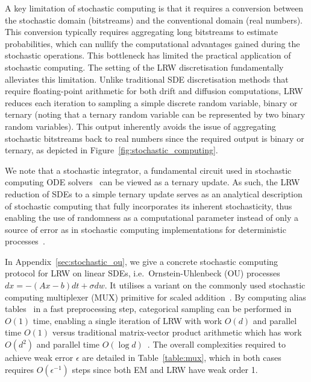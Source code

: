 \documentclass[pra,showpacs,amsmath,amssymb,amsfonts,lengthcheck,longbibliography,onecolumn]{revtex4-2}
\begin{document}
A key limitation of stochastic computing is that it requires a conversion between the stochastic
domain (bitstreams) and the conventional domain (real numbers). This conversion typically requires
aggregating long bitstreams to estimate probabilities, which can nullify the computational
advantages gained during the stochastic operations. This bottleneck has limited the practical
application of stochastic computing. The setting of the LRW discretisation
fundamentally alleviates this limitation. Unlike traditional SDE
discretisation methods that require floating-point arithmetic for both drift and diffusion
computations, LRW reduces each iteration to sampling a simple discrete random variable, binary
or ternary (noting that a ternary random variable can be represented by two binary random
variables).  This output inherently avoids the issue of aggregating stochastic bitstreams
back to real numbers since the required output is binary or ternary, as depicted in Figure~\ref{fig:stochastic_computing}.

We note that a stochastic integrator, a fundamental circuit used in stochastic computing ODE solvers~\cite{gaines1967stochastic, liu2017hardware, liu2020dynamic} can be viewed as a ternary update. As such, the LRW reduction of SDEs to a simple ternary update serves as an analytical description of stochastic computing that fully incorporates its inherent stochasticity, thus enabling the use of randomness as a computational parameter instead of only a source of error as in stochastic computing implementations for deterministic processes~\cite{liu2017hardware, camps2021stochastic}.


In Appendix~\ref{sec:stochastic_ou}, we give a concrete stochastic computing protocol
for LRW on linear SDEs, i.e.\ Ornstein-Uhlenbeck (OU) processes $dx = -(Ax - b)dt + \sigma dw$. It utilises
a variant on the commonly used stochastic computing multiplexer (MUX)
primitive for scaled addition~\cite{gross2019stochastic}. By computing alias tables~\cite{walker1977efficient}
in a fast preprocessing step, categorical sampling can be performed in $O(1)$ time,
enabling a single iteration of LRW with work $O(d)$ and parallel time $O(1)$ versus 
traditional matrix-vector product arithmetic which has work $O(d^2)$ and parallel time 
$O(\log d)$~\cite{blelloch1996programming}. The overall complexities required to achieve weak
error $\epsilon$ are detailed in Table~\ref{table:mux}, which in both cases requires
$O(\epsilon^{-1})$ steps since both EM and LRW have weak order 1.
\end{document}
